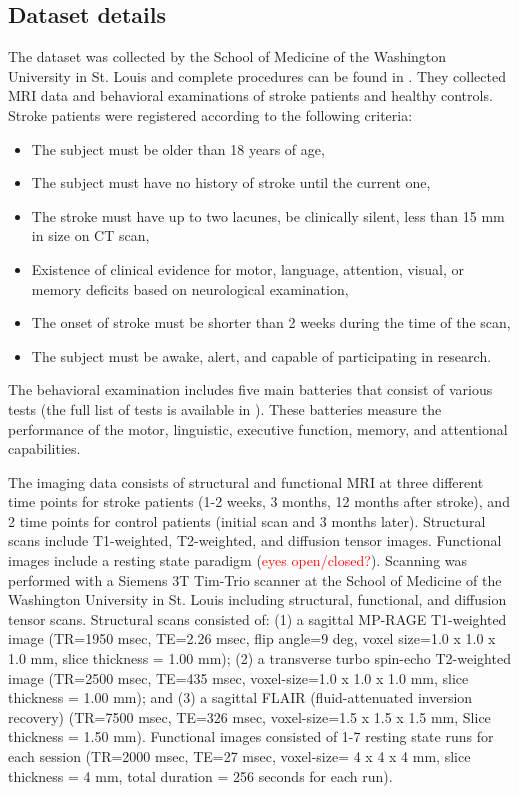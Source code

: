 \documentclass[fleqn,10pt]{wlscirep}
\begin{document}
\subsection*{Dataset details}
The dataset was collected by the School of Medicine
of the Washington University in St. Louis and complete procedures can be found in \cite{corbetta2015common}. They collected MRI data and behavioral examinations of stroke patients and healthy controls. Stroke patients were registered according to the following criteria: 
\begin{itemize}
    \item The subject must be older than 18 years of age,
    \item The subject must have no history of stroke until the current one,
    \item The stroke must have up to two lacunes, be clinically silent, less than 15 mm in size on CT scan,
    \item Existence of clinical evidence for motor, language, attention, visual, or memory deficits based on neurological examination,
    \item The onset of stroke must be shorter than 2 weeks during the time of the scan,
    \item The subject must be awake, alert, and capable of participating in research.
\end{itemize}

The behavioral examination includes five main batteries that consist of various tests (the full list of tests is available in \citet{corbetta2015common}). These batteries measure the performance of the motor, linguistic, executive function, memory, and attentional capabilities. 

The imaging data consists of structural and functional MRI at three different time points for stroke patients (1-2 weeks, 3 months, 12 months after stroke), and 2 time points for control patients (initial scan and 3 months later). Structural scans include T1-weighted, T2-weighted, and diffusion tensor images. Functional images include a resting state paradigm (\textcolor{red}{eyes open/closed?}).  Scanning was performed with a Siemens 3T Tim-Trio scanner at the School of Medicine of the Washington University in St. Louis including structural, functional, and diffusion tensor scans. Structural scans consisted of: (1) a sagittal MP-RAGE T1-weighted image (TR=1950 msec, TE=2.26 msec, flip angle=9 deg, voxel size=1.0 x 1.0 x 1.0 mm, slice thickness = 1.00 mm); (2) a transverse turbo spin-echo T2-weighted image (TR=2500 msec, TE=435 msec, voxel-size=1.0 x 1.0 x 1.0 mm, slice thickness = 1.00 mm); and (3) a sagittal FLAIR (fluid-attenuated inversion recovery) (TR=7500 msec, TE=326 msec, voxel-size=1.5 x 1.5 x 1.5 mm, Slice thickness = 1.50 mm). Functional images consisted of 1-7 resting state runs for each session (TR=2000 msec, TE=27 msec, voxel-size= 4 x 4 x 4 mm, slice thickness = 4 mm, total duration = 256 seconds for each run). 
\end{document}
